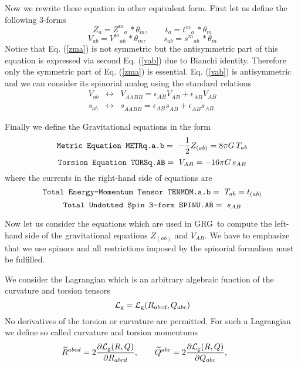 \documentclass[twoside,openright]{report}
\newcommand{\grgtt}{\ttfamily}
\newcommand{\object}[2]{%
\begin{equation}
\mbox{\comm{#1}} =\ #2
\end{equation}}
\newcommand{\tsst}{\longleftrightarrow}
\newcommand{\pref}[1]{page \pageref{#1}}
\newcommand{\seethis}[1]{\marginpar{\footnotesize\it #1}}
\renewcommand{\tt}{\grgtt}
\newcommand{\grg}{{\sc GRG}}
\newcommand{\comm}[1]{{\upshape\tt#1}}    %
\begin{document}
Now we rewrite these equation in other equivalent form.
First let us define the following 3-forms
\begin{equation}
Z_a = Z^m{}_a\,*\theta_m,\qquad t_a = t^m{}_a\,*\theta_m
\end{equation}
\begin{equation}
V_{ab} = V^m{}_{ab}\,*\theta_m,\qquad s_{ab} = s^m{}_{ab}\,*\theta_m
\end{equation}
Notice that Eq. (\ref{zma}) is not symmetric but \label{tsym}
the antisymmetric part of this equation is expressed via second
Eq. (\ref{vab}) due to Bianchi identity. Therefore only the
symmetric part of Eq. (\ref{zma}) is essential.
Eq. (\ref{vab}) is
antisymmetric and we can consider its spinorial analog
using the standard relations
\begin{eqnarray}
V_{ab} &\tsst& V_{A\dot AB\dot B}=
\epsilon_{AB} V_{\dot A\dot B} + \epsilon_{\dot A\dot B}V_{AB} \\
s_{ab} &\tsst& s_{A\dot AB\dot B}=
\epsilon_{AB} s_{\dot A\dot B} + \epsilon_{\dot A\dot B}s_{AB}
\end{eqnarray}  \seethis{See \pref{asys}.}

Finally we define the {\tt Gravitational equations} in the form \label{graveq}
\object{Metric Equation METRq.a.b}{-\frac12Z_{(ab)}=8\pi G\,T_{ab}}
\object{Torsion Equation TORSq.AB}{V_{AB}=-16\pi G\,s_{AB}}
where the currents in the right-hand side of equations are
\seethis{See \pref{totalc}.}
\object{Total Energy-Momentum Tensor TENMOM.a.b}{T_{ab}=t_{(ab)}}
\object{Total Undotted Spin 3-form SPINU.AB}{s_{AB}}

Now let us consider the equations which are used in \grg\ to
compute the left-hand side of the gravitational equations
$Z_{(ab)}$ and $V_{AB}$. We have to emphasize that we use
\seethis{See \pref{spinors}.}
spinors and all restrictions imposed by the spinorial formalism
must be fulfilled.

We consider the Lagrangian which is an arbitrary algebraic function
of the curvature and torsion tensors
\begin{equation}
{\cal L}_{\rm g} = {\cal L}_{\rm g}(R_{abcd},Q_{abc})
\end{equation}
No derivatives of the torsion or curvature are permitted.
For such a Lagrangian we define so called curvature and torsion
momentums
\begin{equation}
\widetilde{R}{}^{abcd} =
2\frac{\partial{\cal L}_{\rm g}(R,Q)}{\partial R_{abcd}},\qquad
\widetilde{Q}{}^{abc} =
2\frac{\partial{\cal L}_{\rm g}(R,Q)}{\partial Q_{abc}},\qquad
\end{equation}
\end{document}
